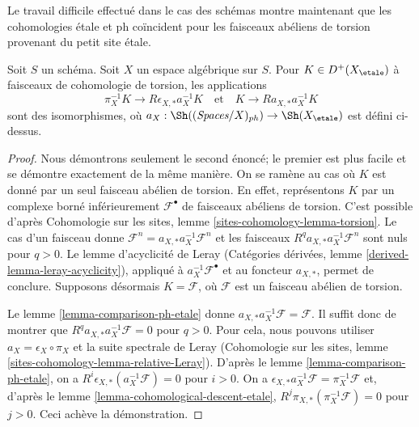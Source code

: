 \noindent
Le travail difficile effectué dans le cas des schémas montre maintenant que
les cohomologies étale et ph coïncident pour les faisceaux abéliens de torsion
provenant du petit site étale.

\begin{lemma}
\label{lemma-cohomological-descent-etale-ph}
Soit $S$ un schéma. Soit $X$ un espace algébrique sur $S$.
Pour $K \in D^+(X_\etale)$ à faisceaux de cohomologie de torsion, les applications
$$
\pi_X^{-1}K \longrightarrow R\epsilon_{X, *}a_X^{-1}K
\quad\text{et}\quad
K \longrightarrow Ra_{X, *}a_X^{-1}K
$$
sont des isomorphismes, où
$a_X : \Sh((\textit{Spaces}/X)_{ph}) \to \Sh(X_\etale)$ est défini ci-dessus.
\end{lemma}

\begin{proof}
Nous démontrons seulement le second énoncé; le premier est plus facile et se
démontre exactement de la même manière. On se ramène au cas où $K$ est donné
par un seul faisceau abélien de torsion. En effet, représentons $K$ par un
complexe borné inférieurement $\mathcal{F}^\bullet$ de faisceaux abéliens de
torsion. C'est possible d'après Cohomologie sur les sites, lemme
\ref{sites-cohomology-lemma-torsion}.
Le cas d'un faisceau donne
$\mathcal{F}^n = a_{X, *} a_X^{-1} \mathcal{F}^n$
et les faisceaux $R^qa_{X, *}a_X^{-1}\mathcal{F}^n$ sont nuls pour $q > 0$.
Le lemme d'acyclicité de Leray (Catégories dérivées, lemme
\ref{derived-lemma-leray-acyclicity}), appliqué à
$a_X^{-1}\mathcal{F}^\bullet$ et au foncteur $a_{X, *}$, permet de conclure.
Supposons désormais $K = \mathcal{F}$, où $\mathcal{F}$ est un faisceau
abélien de torsion.

\medskip\noindent
Le lemme \ref{lemma-comparison-ph-etale} donne
$a_{X, *}a_X^{-1}\mathcal{F} = \mathcal{F}$. Il suffit donc de montrer que
$R^qa_{X, *}a_X^{-1}\mathcal{F} = 0$ pour $q > 0$.
Pour cela, nous pouvons utiliser $a_X = \epsilon_X \circ \pi_X$ et la suite
spectrale de Leray (Cohomologie sur les sites, lemme
\ref{sites-cohomology-lemma-relative-Leray}).
D'après le lemme \ref{lemma-comparison-ph-etale}, on a
$R^i\epsilon_{X, *}(a_X^{-1}\mathcal{F}) = 0$ pour $i > 0$.
On a
$\epsilon_{X, *}a_X^{-1}\mathcal{F} = \pi_X^{-1}\mathcal{F}$
et, d'après le lemme \ref{lemma-cohomological-descent-etale},
$R^j\pi_{X, *}(\pi_X^{-1}\mathcal{F}) = 0$ pour $j > 0$.
Ceci achève la démonstration.
\end{proof}

